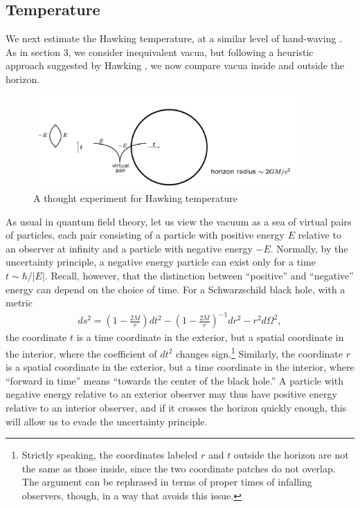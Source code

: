 \documentclass[11pt]{article}
\begin{document}
\subsection{Temperature \label{Tempa}}
We next estimate the Hawking temperature, at a similar level of hand-waving
\cite{Schutz}.  As in section 3, we consider inequivalent vacua,
but following a heuristic approach suggested by Hawking \cite{Hawkingc}, we 
now compare vacua inside and outside the horizon. 
\begin{figure}
\centerline{\includegraphics[width=4in]{fig2b.pdf}}
\caption{A thought experiment for Hawking temperature}
\label{Carlipfig2}
\end{figure}

As usual in quantum field theory, let us view the vacuum as a sea
of virtual pairs of particles, each pair consisting of a particle
with positive energy $E$ relative to an observer at infinity and a particle
with negative energy $-E$.  Normally, by
the uncertainty principle, a negative energy particle can exist only for a 
time $t\sim \hbar/|E|$.  Recall, however, that the distinction between 
``positive'' and ``negative'' energy can depend on the choice of time.
For a Schwarzschild black hole, with a metric
\begin{align}
ds^2 = \left(1-\frac{2M}{r}\right)dt^2 - \left(1-\frac{2M}{r}\right)^{-1}dr^2
        - r^2d\Omega^2  ,
\label{Carlipd4}
\end{align}
the coordinate $t$ is a time coordinate in the exterior, but a spatial coordinate
in the interior, where the coefficient of $dt^2$ changes sign.\footnote{Strictly 
speaking, the coordinates labeled $r$ and $t$ outside the 
horizon are not the same as those inside, since the two coordinate patches 
do not overlap.  The argument can be rephrased in terms of proper times of
infalling observers, though, in a way that avoids this issue.}
Similarly, the coordinate $r$ is a spatial coordinate in the exterior, but a time 
coordinate in the interior, where ``forward in time'' means ``towards the 
center of the black hole.''   A particle with negative energy relative to an 
exterior observer may thus have positive energy relative to an interior 
observer, and if it crosses the horizon quickly enough, this will allow us to 
evade the uncertainty principle.
\end{document}
